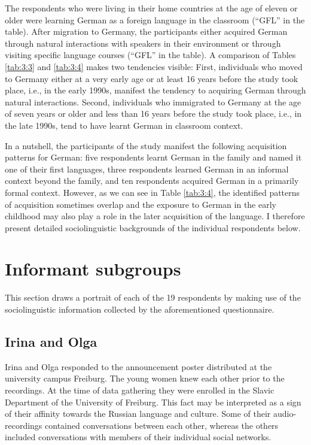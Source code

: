 The respondents who were living in their home countries at the age of eleven or older were learning German as a foreign language in the classroom (“GFL” in the table). After migration to Germany, the participants either acquired German through natural interactions with speakers in their environment or through visiting specific language courses (“GFL” in the table). A comparison of Tables \ref{tab:3:3} and \ref{tab:3:4} makes two tendencies visible: First, individuals who moved to Germany either at a very early age or at least 16 years before the study took place, i.e., in the early 1990s, manifest the tendency to acquiring German through natural interactions. Second, individuals who immigrated to Germany at the age of seven years or older and less than 16 years before the study took place, i.e., in the late 1990s, tend to have learnt German in classroom context.

In a nutshell, the participants of the study manifest the following acquisition patterns for German: five respondents learnt German in the family and named it one of their first languages, three respondents learned German in an informal context beyond the family, and ten respondents acquired German in a primarily formal context. However, as we can see in Table \ref{tab:3:4}, the identified patterns of acquisition sometimes overlap and the exposure to German in the early childhood may also play a role in the later acquisition of the language. I therefore present detailed sociolinguistic backgrounds of the individual respondents below.

\section{Informant subgroups}\label{subgroups}

This section draws a portrait of each of the 19 respondents by making use of the sociolinguistic information collected by the aforementioned questionnaire.

\subsection{Irina and Olga}

Irina and Olga responded to the announcement poster distributed at the university campus Freiburg. The young women knew each other prior to the recordings. At the time of data gathering they were enrolled in the Slavic Department of the University of Freiburg. This fact may be interpreted as a sign of their affinity towards the Russian language and culture. Some of their audio-recordings contained conversations between each other, whereas the others included conversations with members of their individual social networks.

